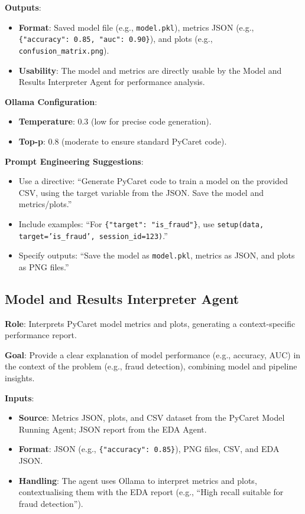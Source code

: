 \documentclass{article}
\begin{document}
\textbf{Outputs}:
\begin{itemize}[label=--]
    \item \textbf{Format}: Saved model file (e.g., \texttt{model.pkl}), metrics JSON (e.g., \texttt{\{"accuracy": 0.85, "auc": 0.90\}}), and plots (e.g., \texttt{confusion\_matrix.png}).
    \item \textbf{Usability}: The model and metrics are directly usable by the Model and Results Interpreter Agent for performance analysis.
\end{itemize}

\textbf{Ollama Configuration}:
\begin{itemize}[label=--]
    \item \textbf{Temperature}: 0.3 (low for precise code generation).
    \item \textbf{Top-p}: 0.8 (moderate to ensure standard PyCaret code).
\end{itemize}

\textbf{Prompt Engineering Suggestions}:
\begin{itemize}[label=--]
    \item Use a directive: “Generate PyCaret code to train a model on the provided CSV, using the target variable from the JSON. Save the model and metrics/plots.”
    \item Include examples: “For \texttt{\{"target": "is\_fraud"\}}, use \texttt{setup(data, target='is\_fraud', session\_id=123)}.”
    \item Specify outputs: “Save the model as \texttt{model.pkl}, metrics as JSON, and plots as PNG files.”
\end{itemize}

\subsection{Model and Results Interpreter Agent}

\textbf{Role}: Interprets PyCaret model metrics and plots, generating a context-specific performance report.

\textbf{Goal}: Provide a clear explanation of model performance (e.g., accuracy, AUC) in the context of the problem (e.g., fraud detection), combining model and pipeline insights.

\textbf{Inputs}:
\begin{itemize}[label=--]
    \item \textbf{Source}: Metrics JSON, plots, and CSV dataset from the PyCaret Model Running Agent; JSON report from the EDA Agent.
    \item \textbf{Format}: JSON (e.g., \texttt{\{"accuracy": 0.85\}}), PNG files, CSV, and EDA JSON.
    \item \textbf{Handling}: The agent uses Ollama to interpret metrics and plots, contextualising them with the EDA report (e.g., “High recall suitable for fraud detection”).
\end{itemize}
\end{document}
